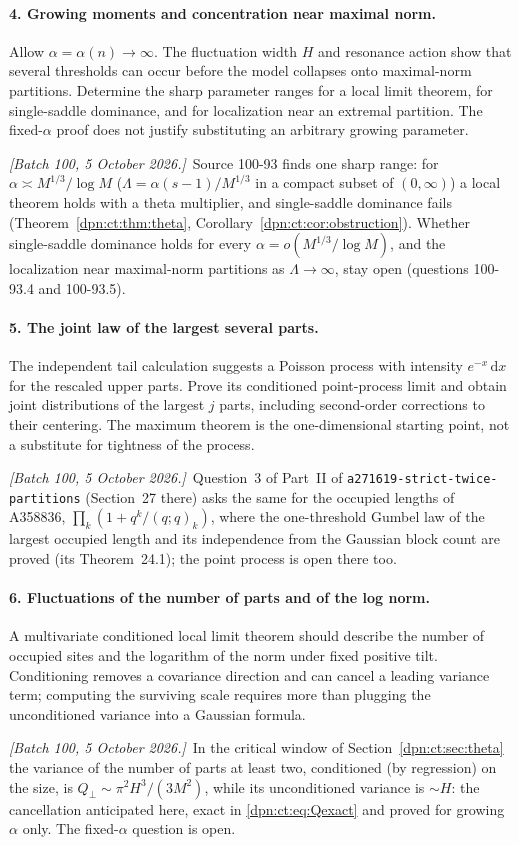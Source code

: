 \documentclass[11pt]{article}
\numberwithin{equation}{section}
\theoremstyle{definition}\newtheorem{definition}[theorem]{Definition}
\theoremstyle{remark}\newtheorem{remark}[theorem]{Remark}
\newcommand{\dd}{\,\mathrm d}\newcommand{\ii}{\mathrm i}
\newcommand{\writenoted}[1]{\par\smallskip\noindent\textit{[Batch 100, 5 October 2026.]}\ #1\par\smallskip}
\begin{document}
\paragraph{4. Growing moments and concentration near maximal norm.}
Allow $\alpha=\alpha(n)\to\infty$. The fluctuation width $H$ and resonance
action show that several thresholds can occur before the model collapses onto
maximal-norm partitions. Determine the sharp parameter ranges for a local
limit theorem, for single-saddle dominance, and for localization near an
extremal partition. The fixed-$\alpha$ proof does not justify substituting an
arbitrary growing parameter.
\writenoted{Source 100-93 finds one sharp range: for $\alpha\asymp M^{1/3}/\log M$
($\Lambda=\alpha(s-1)/M^{1/3}$ in a compact subset of $(0,\infty)$) a local
theorem holds with a theta multiplier, and single-saddle dominance fails
(Theorem~\ref{dpn:ct:thm:theta}, Corollary~\ref{dpn:ct:cor:obstruction}).
Whether single-saddle dominance holds for every $\alpha=o(M^{1/3}/\log M)$, and
the localization near maximal-norm partitions as $\Lambda\to\infty$, stay open
(questions 100-93.4 and 100-93.5).}

\paragraph{5. The joint law of the largest several parts.}
The independent tail calculation suggests a Poisson process with intensity
$e^{-x}\dd x$ for the rescaled upper parts. Prove its conditioned point-process
limit and obtain joint distributions of the largest $j$ parts, including
second-order corrections to their centering. The maximum theorem is the
one-dimensional starting point, not a substitute for tightness of the process.
\writenoted{Question~3 of Part~II of
\texttt{a271619-\allowbreak strict-\allowbreak twice-\allowbreak partitions}
(Section~27 there) asks the same for the occupied lengths of A358836,
$\prod_k(1+q^k/(q;q)_k)$, where the one-threshold Gumbel law of the largest
occupied length and its independence from the Gaussian block count are
proved (its Theorem~24.1); the point process is open there too.}

\paragraph{6. Fluctuations of the number of parts and of the log norm.}
A multivariate conditioned local limit theorem should describe the number of
occupied sites and the logarithm of the norm under fixed positive tilt.
Conditioning removes a covariance direction and can cancel a leading
variance term; computing the surviving scale requires more than plugging the
unconditioned variance into a Gaussian formula.
\writenoted{In the critical window of Section~\ref{dpn:ct:sec:theta} the
variance of the number of parts at least two, conditioned (by regression) on
the size, is $Q_\perp\sim\pi^2H^3/(3M^2)$, while its unconditioned variance is
$\sim H$: the cancellation anticipated here, exact in \eqref{dpn:ct:eq:Qexact}
and proved for growing $\alpha$ only.  The fixed-$\alpha$ question is open.}
\end{document}
